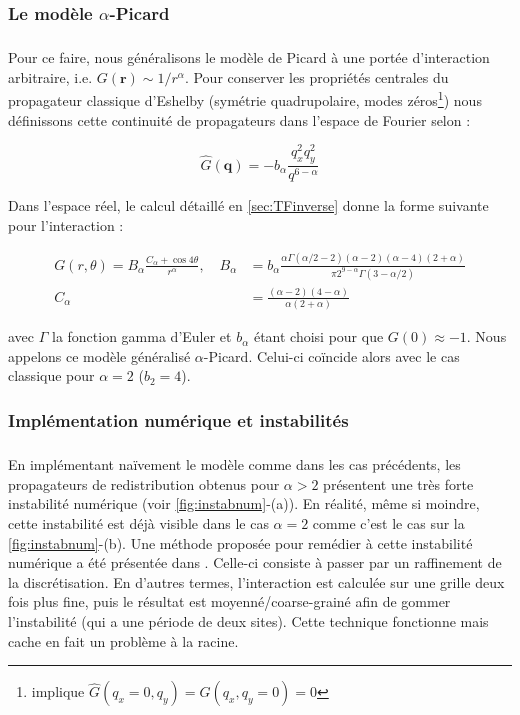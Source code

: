 \subsubsection{Le modèle $\alpha$-Picard}

\subparagraph{}Pour ce faire, nous généralisons le modèle de Picard à une portée d'interaction arbitraire, i.e. $G(\mathbf{r})\sim 1/r^\alpha$. Pour conserver les propriétés centrales du propagateur classique d'Eshelby (symétrie quadrupolaire, modes zéros\footnote{implique $\hat{G}(q_x=0,q_y)=\hat{G}(q_x,q_y=0)=0$}) nous définissons cette continuité de propagateurs dans l'espace de Fourier selon :

\begin{equation}
	\hat{G}(\mathbf{q}) = -b_\alpha \frac{q_x^2 q_y^2}{q^{6-\alpha}}
\end{equation}

\noindent Dans l'espace réel, le calcul détaillé en \autoref{sec:TFinverse} donne la forme suivante pour l'interaction :

\begin{equation}
\begin{aligned}
    G(r, \theta) = B_\alpha\frac{C_\alpha+\cos 4\theta}{r^\alpha}, \quad B_\alpha &= b_\alpha\frac{\alpha\Gamma(\alpha/2-2)(\alpha-2)(\alpha-4)(2+\alpha)}{\pi 2^{9-\alpha}\Gamma(3-\alpha/2)}\\
    C_\alpha &= \frac{(\alpha-2)(4-\alpha)}{\alpha (2+\alpha)}
\end{aligned}
    \label{eq:RealAlphaPicard}
\end{equation}

\noindent avec $\Gamma$ la fonction gamma d'Euler et $b_\alpha$ étant choisi pour que $G(0)\approx-1$. Nous appelons ce modèle généralisé $\alpha$-Picard. Celui-ci coïncide alors avec le cas classique pour $\alpha=2$ ($b_2 = 4$).

\subsubsection{Implémentation numérique et instabilités}

\label{sec:instab_yielding}

\subparagraph{}En implémentant naïvement le modèle comme dans les cas précédents, les propagateurs de redistribution obtenus pour $\alpha>2$ présentent une très forte instabilité numérique (voir \autoref{fig:instabnum}-(a)). En réalité, même si moindre, cette instabilité est déjà visible dans le cas $\alpha=2$ comme c'est le cas sur la \autoref{fig:instabnum}-(b). Une méthode proposée pour remédier à cette instabilité numérique a été présentée dans \cite{nicolas_ecoulements_2014}. Celle-ci consiste à passer par un raffinement de la discrétisation. En d'autres termes, l'interaction est calculée sur une grille deux fois plus fine, puis le résultat est moyenné/coarse-grainé afin de gommer l'instabilité (qui a une période de deux sites). Cette technique fonctionne mais cache en fait un problème à la racine. 

